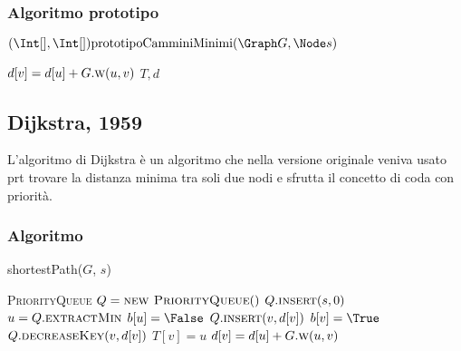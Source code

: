         \subsubsection{Algoritmo prototipo}
            \begin{algorithm}[H]
                \caption{$(\Int[], \Int[]) \text{prototipoCamminiMinimi}(\Graph G, \Node s)$}
                \begin{algorithmic}
                    \State {}
                    \State {}
                        \State $d[v]=d[u]+G.\Call{w}{u,v}$
                        \State {}
                    \EndWhile
                    \State \Return $T,d$
                \end{algorithmic}
            \end{algorithm}
    \subsection{Dijkstra, 1959}
        L'algoritmo di Dijkstra è un algoritmo che nella versione originale veniva usato prt trovare la distanza minima tra soli due nodi e sfrutta il concetto di coda con priorità.
        \subsubsection{Algoritmo}
            \begin{algorithm}[H]
                \caption{shortestPath(\Graph $G$, \Node $s$)}
                \begin{algorithmic}
                    \State \textsc{PriorityQueue} $Q = \textsc{new PriorityQueue}()$
                    \State $Q.\Call{insert}{s,0}$
                        \State \Int $u = Q.\Call{extractMin}{}$
                        \State $b[u]=\False$
                                    \State $Q.\Call{insert}{v,d[v]}$
                                    \State $b[v]=\True$
                                \Else
                                    \State $Q.\Call{decreaseKey}{v,d[v]}$
                                \EndIf
                                \State $T[v]=u$
                                \State $d[v]=d[u]+G.\Call{w}{u,v}$
                            \EndIf
                        \EndFor
                    \EndWhile
                \end{algorithmic}
            \end{algorithm}
